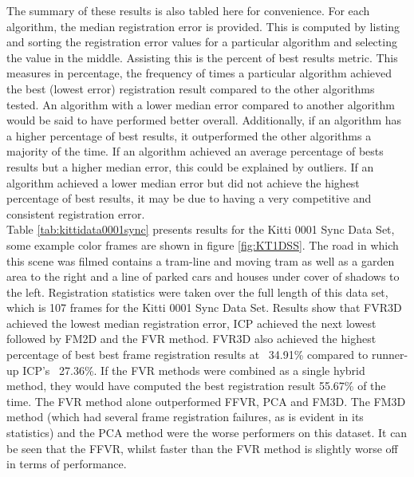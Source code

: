 The summary of these results is also tabled here for convenience. For each algorithm, the median registration error is provided. This is computed by listing and sorting the registration error values for a particular algorithm and selecting the value in the middle. Assisting this is the percent of best results metric. This measures in percentage, the frequency of times a particular algorithm achieved the best (lowest error) registration result compared to the other algorithms tested. An algorithm with a lower median error compared to another algorithm would be said to have performed better overall. Additionally, if an algorithm has a higher percentage of best results, it outperformed the other algorithms a majority of the time. If an algorithm achieved an average percentage of bests results but a higher median error, this could be explained by outliers. If an algorithm achieved a lower median error but did not achieve the highest percentage of best results, it may be due to having a very competitive and consistent registration error. \\

Table \ref{tab:kittidata0001sync} presents results for the Kitti 0001 Sync Data Set, some example color frames are shown in figure \ref{fig:KT1DSS}. The road in which this scene was filmed contains a tram-line and moving tram as well as a garden area to the right and a line of parked cars and houses under cover of shadows to the left. Registration statistics were taken over the full length of this data set, which is 107 frames for the Kitti 0001 Sync Data Set. Results show that FVR3D achieved the lowest median registration error, ICP achieved the next lowest followed by FM2D and the FVR method. FVR3D also achieved the highest percentage of best best frame registration results at ~34.91\% compared to runner-up ICP's ~27.36\%. If the FVR methods were combined as a single hybrid method, they would have computed the best registration result 55.67\% of the time. The FVR method alone outperformed FFVR, PCA and FM3D. The FM3D method (which had several frame registration failures, as is evident in its statistics) and the PCA method were the worse performers on this dataset. It can be seen that the FFVR, whilst faster than the FVR method is slightly worse off in terms of performance. \\ 



